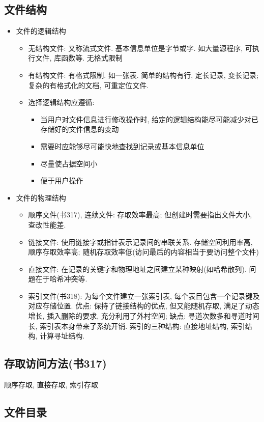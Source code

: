 \documentclass[a4paper, UTF8]{article}
\begin{document}
\subsection{文件结构}
\begin{itemize}
\item 文件的逻辑结构
	\begin{itemize}
	\item 无结构文件: 又称流式文件. 基本信息单位是字节或字. 如大量源程序, 可执行文件, 库函数等. 无格式限制
	\item 有结构文件: 有格式限制. 如一张表. 简单的结构有行, 定长记录, 变长记录; 复杂的有格式化的文档, 可重定位文件.
	\item 选择逻辑结构应遵循:
		\begin{itemize}
		\item 当用户对文件信息进行修改操作时, 给定的逻辑结构能尽可能减少对已存储好的文件信息的变动
		\item 需要时应能够尽可能快地查找到记录或基本信息单位
		\item 尽量使占据空间小
		\item 便于用户操作
		\end{itemize}
	\end{itemize}
\item 文件的物理结构
	\begin{itemize}
	\item 顺序文件(书317), 连续文件: 存取效率最高; 但创建时需要指出文件大小, 查改性能差.
	\item 链接文件: 使用链接字或指针表示记录间的串联关系. 存储空间利用率高, 顺序存取效率高; 随机存取效率低(访问最后的内容相当于要访问整个文件)
	\item 直接文件: 在记录的关键字和物理地址之间建立某种映射(如哈希散列). 问题在于哈希冲突等.
	\item 索引文件(书318): 为每个文件建立一张索引表, 每个表目包含一个记录键及对应存储位置. 优点: 保持了链接结构的优点, 但又能随机存取, 满足了动态增长, 插入删除的要求, 充分利用了外村空间; 缺点: 寻道次数多和寻道时间长, 索引表本身带来了系统开销. 索引的三种结构: 直接地址结构, 索引结构, 计算寻址结构.
	\end{itemize}
\end{itemize}
\subsection{存取访问方法(书317)}
顺序存取, 直接存取, 索引存取
\subsection{文件目录}
\end{document}
